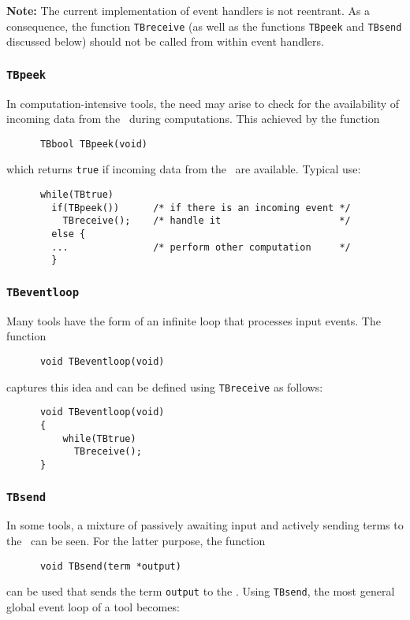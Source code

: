 \documentclass[a4,twoside,noweb]{article} %
\begin{document}
{\bf Note:} The current implementation of event handlers is not reentrant.
As a consequence, the function {\tt TBreceive} (as well as the
functions {\tt TBpeek} and {\tt TBsend} discussed below)
should not be called from within event handlers.

\subsubsection{\label{TBpeek}{\tt TBpeek}}
In computation-intensive tools, the need may arise to
check for the availability of incoming data from the \TB\ during
computations. This achieved by the function
\begin{verbatim}
      TBbool TBpeek(void)
\end{verbatim}
which returns {\tt true} if incoming data from the \TB\ are available.
Typical use:
\begin{verbatim}
      while(TBtrue)
        if(TBpeek())      /* if there is an incoming event */
          TBreceive();    /* handle it                     */
        else {
        ...               /* perform other computation     */
        }
\end{verbatim}



\subsubsection{\label{TBeventloop}{\tt TBeventloop}}
Many tools have the form of an infinite loop
that processes input events.
The function
\begin{verbatim}
      void TBeventloop(void)
\end{verbatim}
captures this idea and can be
defined using {\tt TBreceive} as follows:
\begin{verbatim}
      void TBeventloop(void)
      {
          while(TBtrue)
            TBreceive();
      }
\end{verbatim}

\subsubsection{\label{TBsend}{\tt TBsend}}

In some tools, a mixture of passively awaiting input
and actively sending terms to the \TB\ can be seen.
For the latter purpose, the function
\begin{verbatim}
      void TBsend(term *output)
\end{verbatim}
can be used that sends the term {\tt output} to the \TB.
Using {\tt TBsend}, the most general global event loop of a tool becomes:
\end{document}
